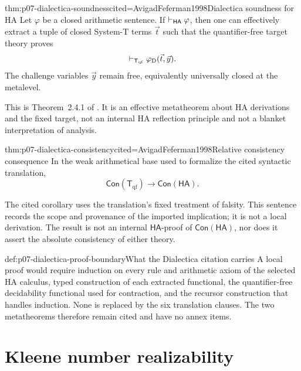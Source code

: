 \begin{hbtheorem}{thm:p07-dialectica-soundness}{cited=AvigadFeferman1998}{Dialectica soundness for HA}
Let \(\varphi\) be a closed arithmetic sentence.  If
\(\vdash_{\mathsf{HA}}\varphi\), then
one can effectively extract a tuple of closed System-T terms \(\vec t\) such that
the quantifier-free target theory proves
\[
  \vdash_{\mathsf T_{\mathrm{qf}}}\varphi_{\mathrm D}(\vec t,\vec y).
\]
The challenge variables \(\vec y\) remain free, equivalently universally
closed at the metalevel.
\end{hbtheorem}

This is Theorem~2.4.1 of \cite{AvigadFeferman1998}.  It is an effective
metatheorem about HA derivations and the fixed target, not an internal HA
reflection principle and not a blanket interpretation of analysis.

\begin{hbcorollary}{thm:p07-dialectica-consistency}{cited=AvigadFeferman1998}{Relative consistency consequence}
In the weak arithmetical base used to formalize the cited syntactic
translation,
\[
  \mathsf{Con}(\mathsf T_{\mathrm{qf}})\to\mathsf{Con}(\mathsf{HA}).
\]
\end{hbcorollary}

The cited corollary uses the translation's fixed treatment of falsity.  This
sentence records the scope and provenance of the imported implication; it is
not a local derivation.  The result is not an internal
\(\mathsf{HA}\)-proof of \(\mathsf{Con}(\mathsf{HA})\), nor does it assert the
absolute consistency of either theory.

\begin{proofboundary}{def:p07-dialectica-proof-boundary}{What the Dialectica citation carries}
A local proof would require induction on every rule and arithmetic axiom of
the selected HA calculus, typed construction of each extracted functional,
the quantifier-free decidability functional used for contraction, and the
recursor construction that handles induction.  None is replaced by the six
translation clauses.  The two metatheorems therefore remain cited and have no
annex items.
\end{proofboundary}

\section{Kleene number realizability}
\label{sec:p07-number-realizability}

